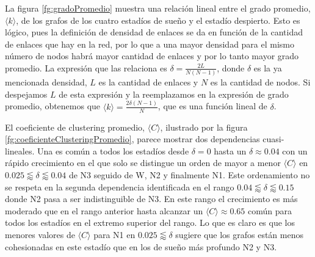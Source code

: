 \documentclass{article}
\begin{document}
La figura \ref{fg:gradoPromedio} muestra una relación lineal entre el grado promedio, $\langle k \rangle$, de los grafos de los cuatro estadíos de sueño y el estadío despierto.
Esto es lógico, pues la definición de densidad de enlaces se da en función de la cantidad de enlaces que hay en la red, por lo que a una mayor densidad para el mismo número de nodos habrá mayor cantidad de enlaces y por lo tanto mayor grado promedio.
La expresión que las relaciona es $\delta = \frac{2L}{N(N-1)}$, donde $\delta$ es la ya mencionada densidad, $L$ es la cantidad de enlaces y $N$ es la cantidad de nodos. Si despejamos $L$ de esta expresión y la reemplazamos en la expresión de grado promedio, obtenemos que $\langle k \rangle = \frac{2 \delta (N-1)}{N}$, que es una función lineal de $\delta$.

El coeficiente de clustering promedio, $\langle C \rangle$, ilustrado por la figura \ref{fg:coeficienteClusteringPromedio}, parece mostrar dos dependencias cuasi-lineales.
Una es común a todos los estadíos desde $\delta = 0$ hasta un $\delta \approx 0.04$ con un rápido crecimiento en el que solo se distingue un orden de mayor a menor $\langle C \rangle$ en $0.025 \lessapprox \delta \lessapprox 0.04$ de N3 seguido de W, N2 y finalmente N1.
Este ordenamiento no se respeta en la segunda dependencia identificada en el rango $0.04 \lessapprox \delta \lessapprox 0.15$ donde N2 pasa a ser indistinguible de N3.
En este rango el crecimiento es más moderado que en el rango anterior hasta alcanzar un $\langle C \rangle \approx 0.65$ común para todos los estadíos en el extremo superior del rango.
Lo que es claro es que los menores valores de $\langle C \rangle$ para N1 en $0.025 \lessapprox \delta$ sugiere que los grafos están menos cohesionadas en este estadío que en los de sueño más profundo N2 y N3.
\end{document}
